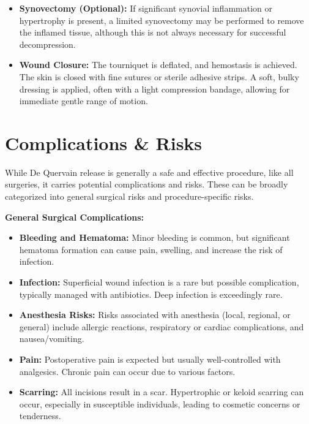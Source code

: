 \begin{itemize}
  \item \textbf{Synovectomy (Optional):} If significant synovial inflammation or hypertrophy is present, a limited synovectomy may be performed to remove the inflamed tissue, although this is not always necessary for successful decompression.
  \item \textbf{Wound Closure:} The tourniquet is deflated, and hemostasis is achieved. The skin is closed with fine sutures or sterile adhesive strips. A soft, bulky dressing is applied, often with a light compression bandage, allowing for immediate gentle range of motion.
\end{itemize}

\section*{Complications \& Risks}
While De Quervain release is generally a safe and effective procedure, like all surgeries, it carries potential complications and risks. These can be broadly categorized into general surgical risks and procedure-specific risks.

\textbf{General Surgical Complications:}
\begin{itemize}
  \item \textbf{Bleeding and Hematoma:} Minor bleeding is common, but significant hematoma formation can cause pain, swelling, and increase the risk of infection.
  \item \textbf{Infection:} Superficial wound infection is a rare but possible complication, typically managed with antibiotics. Deep infection is exceedingly rare.
  \item \textbf{Anesthesia Risks:} Risks associated with anesthesia (local, regional, or general) include allergic reactions, respiratory or cardiac complications, and nausea/vomiting.
  \item \textbf{Pain:} Postoperative pain is expected but usually well-controlled with analgesics. Chronic pain can occur due to various factors.
  \item \textbf{Scarring:} All incisions result in a scar. Hypertrophic or keloid scarring can occur, especially in susceptible individuals, leading to cosmetic concerns or tenderness.
\end{itemize}

